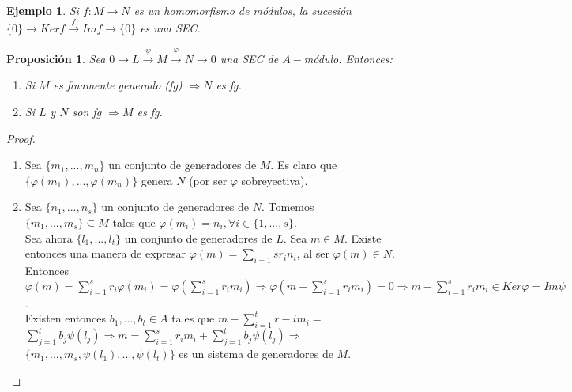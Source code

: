 \documentclass[11pt,a4paper]{article}
\theoremstyle{break}
\newtheorem{example}[theorem]{Ejemplo}
\newtheorem{proposition}[theorem]{Proposición}
\begin{document}
\begin{example}
Si $f: M \to N$ es un homomorfismo de módulos, la sucesión $\{0\} \to Ker f \overset{f}{\to} Im f \to \{0\}$ es una SEC.
\end{example}

\begin{proposition}
Sea $0 \to L \overset{\psi}{\to} M \overset{\varphi}{\to} N \to 0$ una SEC de $A-$módulo. Entonces:
\begin{enumerate}
\item Si $M$ es finamente generado (fg) $\Rightarrow N$ es fg.
\item Si $L$ y $N$ son fg $\Rightarrow M$ es fg.
\end{enumerate}
\end{proposition}

\begin{proof}
\begin{enumerate}
\item Sea $\{m_{1}, ..., m_{n}\}$ un conjunto de generadores de $M$. Es claro que $\{\varphi(m_{1}), ..., \varphi(m_{n})\}$ genera $N$ (por ser $\varphi$ sobreyectiva).

\item Sea $\{n_{1}, ..., n_{s}\}$ un conjunto de generadores de $N$. Tomemos \\ $\{m_{1}, ..., m_{s}\} \subseteq M$ tales que $\varphi(m_{i}) = n_{i}, \forall i \in \{1, ..., s\}$. \\
Sea ahora $\{l_{1}, ..., l_{t}\}$ un conjunto de generadores de $L$. Sea $m \in M$. Existe entonces una manera de expresar $\varphi(m) = \sum_{i=1}{s} r_{i}n_{i}$, al ser $\varphi(m) \in N$. Entonces $\varphi(m) = \sum_{i=1}^{s} r_{i}\varphi(m_{i}) = \varphi(\sum_{i=1}^{s} r_{i}m_{i}) \Rightarrow \varphi(m - \sum_{i=1}^{s} r_{i}m_{i}) = 0 \Rightarrow m - \sum_{i=1}^{s} r_{i}m_{i} \in Ker \varphi = Im \psi$. \\
Existen entonces $b_{1}, ..., b_{t} \in A$ tales que $m - \sum_{i=1}^{t} r-{i}m_{i} =$ \\ $\sum_{j=1}^{t} b_{j} \psi(l_{j}) \Rightarrow m = \sum_{i=1}^{s} r_{i}m_{i} + \sum_{j=1}^{t} b_{j}\psi(l_{j}) \Rightarrow$ \\ $\{m_{1}, ..., m_{s}, \psi(l_{1}), ..., \psi(l_{t})\}$ es un sistema de generadores de $M$.
\end{enumerate}
\end{proof}
\end{document}
